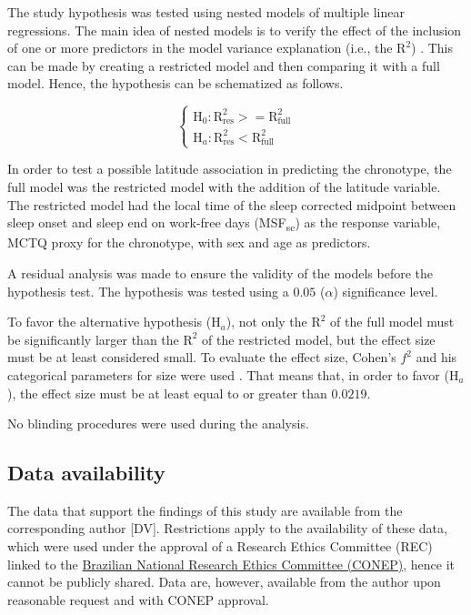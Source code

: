 \documentclass[
12pt,
openright,
oneside,
a4paper,
chapter=TITLE,
section=TITLE,
french,
spanish,
brazil,
english
]{abntex2}\usepackage{array}
\begin{document}
The study hypothesis was tested using nested models of multiple linear
regressions. The main idea of nested models is to verify the effect of
the inclusion of one or more predictors in the model variance
explanation (i.e., the \(\text{R}^{2}\)) \autocite{allen1997}. This can
be made by creating a restricted model and then comparing it with a full
model. Hence, the hypothesis can be schematized as follows.

\[
\begin{cases}
\text{H}_{0}: \text{R}^{2}_{\text{res}} >= \text{R}^{2}_{\text{full}} \\
\text{H}_{a}: \text{R}^{2}_{\text{res}} < \text{R}^{2}_{\text{full}}
\end{cases}
\]

\smallskip

In order to test a possible latitude association in predicting the
chronotype, the full model was the restricted model with the addition of
the latitude variable. The restricted model had the local time of the
sleep corrected midpoint between sleep onset and sleep end on work-free
days (MSF\textsubscript{sc}) as the response variable, MCTQ proxy for
the chronotype, with sex and age as predictors.

A residual analysis was made to ensure the validity of the models before
the hypothesis test. The hypothesis was tested using a \(0.05\)
(\(\alpha\)) significance level.

To favor the alternative hypothesis (\(\text{H}_{a}\)), not only the
\(\text{R}^{2}\) of the full model must be significantly larger than the
\(\text{R}^{2}\) of the restricted model, but the effect size must be at
least considered small. To evaluate the effect size, Cohen's \(f^{2}\)
and his categorical parameters for size were used \autocite{cohen1992}.
That means that, in order to favor (\(\text{H}_{a}\)), the effect size
must be at least equal to or greater than \(0.0219\).

No blinding procedures were used during the analysis.

\subsection{Data availability}\label{data-availability}

The data that support the findings of this study are available from the
corresponding author {[}DV{]}. Restrictions apply to the availability of
these data, which were used under the approval of a Research Ethics
Committee (REC) linked to the
\href{https://conselho.saude.gov.br/Web_comissoes/conep/index.html}{Brazilian
National Research Ethics Committee (CONEP)}, hence it cannot be publicly
shared. Data are, however, available from the author upon reasonable
request and with CONEP approval.
\end{document}
